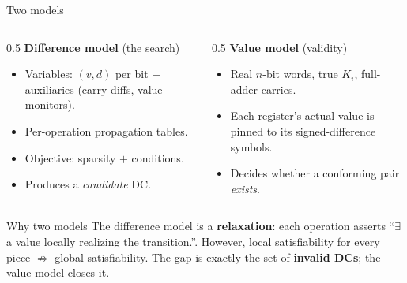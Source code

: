 \documentclass[aspectratio=169,9pt]{beamer}
\newcommand{\key}[1]{\textcolor{key}{\textbf{#1}}}
\begin{document}
\begin{frame}{Two models}
\begin{columns}
\begin{column}{0.5\textwidth}
\textbf{Difference model} (the search)
\begin{itemize}
  \item Variables: $(v,d)$ per bit $+$ auxiliaries (carry-diffs, value monitors).
  \item Per-operation propagation tables.
  \item Objective: sparsity $+$ conditions.
  \item Produces a \emph{candidate} DC.
\end{itemize}
\end{column}
\begin{column}{0.5\textwidth}
\textbf{Value model} (validity)
\begin{itemize}
  \item Real $n$-bit words, true $K_i$, full-adder carries.
  \item Each register's actual value is pinned to its signed-difference symbols.
  \item Decides whether a conforming pair \emph{exists}.
\end{itemize}
\end{column}
\end{columns}
\vspace{0.4em}
\begin{alertblock}{Why two models}
 The difference model is a \key{relaxation}: each operation asserts ``$\exists$ a value locally realizing the transition.''. However, local satisfiability for every piece $\not\Rightarrow$ global satisfiability. The gap is exactly the set of \key{invalid DCs}; the value model closes it.
\end{alertblock}
\end{frame}
\end{document}

